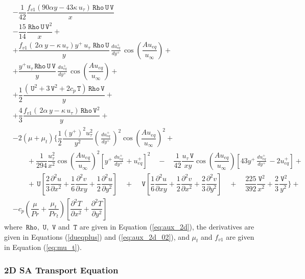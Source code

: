 \documentclass[10pt]{article}
\newcommand{\diff}[2] {\dfrac{\partial #1}{\partial #2}}
\newcommand{\Rho}{\,\mathtt{Rho}}
\newcommand{\U}{\,\mathtt{U}}
\newcommand{\V}{\,\mathtt{V}}
\newcommand{\T}{\,\mathtt{T}}
\newcommand{\Dueqplusyplus}{\, \frac{du_{eq}^+}{dy^+}\,}
\begin{document}
\begin{equation}
\begin{split}
&-\dfrac{1}{42} \dfrac{f_{v1} (90\alpha y -43 \kappa\,  u_{\tau}) \Rho \U \V}{x}\\ 
&-\dfrac{15}{14} \dfrac{\Rho \U \V^2}{x}+\\
&+\dfrac{f_{v1}(\,2 \alpha \,y   - \kappa\, u_{\tau})  y^{+}\, u_{\tau}\, \Rho \U }{y} \Dueqplusyplus\cos\left(\dfrac{A u_{eq}}{u_{\infty}}\right)+\\
&+\dfrac{y^{+} u_{\tau} \Rho \U \V }{y} \Dueqplusyplus\cos\left(\dfrac{A u_{eq}}{u_{\infty}}\right)+\\ 
&+\dfrac{1}{2} \dfrac{(\U^2+3 \V^2+2 c_p \T) \Rho \V }{y}+\\
&+\dfrac{4}{3}\dfrac{  f_{v1}(\,2 \alpha \,y   - \kappa\, u_{\tau}) \Rho \V^2}{y}+\\
&-2(\mu+\mu_t) \Bigg\{\dfrac{1}{2}\dfrac{( y^{+})^2 u_{\tau}^2 }{y^2}\left(\Dueqplusyplus\right)^2 \cos\left(\dfrac{A u_{eq}}{u_{\infty}}\right)^2+\\ 
&\qquad+\dfrac{1}{294} \dfrac{u_{\tau}^2 }{x^2}\cos\left(\dfrac{A u_{eq}}{u_{\infty}}\right)^2\left[y^{+} \Dueqplusyplus+u_{eq}^{+}\right]^2 \quad-\quad\dfrac{1}{42} \dfrac{ u_{\tau} \V }{x y}\cos\left(\dfrac{A u_{eq}}{u_{\infty}}\right)\left[43 y^{+} \Dueqplusyplus-2 u_{eq}^{+}\right] +\\
&\qquad+\U\left[\dfrac{2}{3} \diff{^2u}{x^2}+\dfrac{1}{6} \diff{^2v}{xy}+\dfrac{1}{2} \diff{^2u}{y^2}\right]  \quad+\quad \V\left[\dfrac{1}{6} \diff{^2u}{xy}+\dfrac{1}{2} \diff{^2v}{x^2}+\dfrac{2}{3} \diff{^2v}{y^2}\right]\quad +\quad\dfrac{225}{392} \dfrac{ \V^2}{x^2} +\dfrac{2}{3} \dfrac{\V^2}{y^2}\Bigg\} +\\ 
&-c_p\left(\dfrac{\mu}{Pr}+\dfrac{\mu_t}{Pr_t}\right) \left[\diff{^2T}{x^2}+\diff{^2T}{y^2}\right] 
 \end{split}
\end{equation}
%
where  $\Rho,\,\U,\,\V$ and $\T$ are given in Equation (\ref{eq:aux_2d}), the derivatives are given in Equations (\ref{dueqplus}) and (\ref{eq:aux_2d_02}), and $\mu_t$ and $f_{v1}$ are given in  Equation (\ref{eq:mu_t}).



\subsubsection{2D SA Transport Equation}
\end{document}
